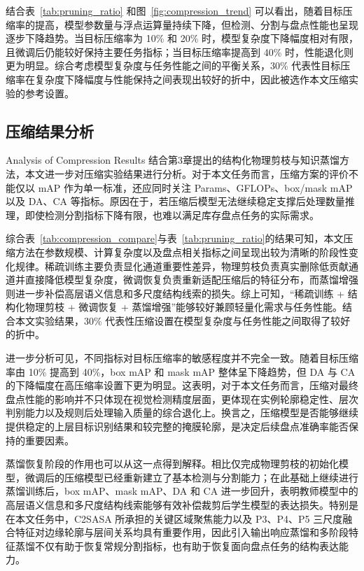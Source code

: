 结合表~\ref{tab:pruning_ratio} 和图~\ref{fig:compression_trend} 可以看出，随着目标压缩率的提高，模型参数量与浮点运算量持续下降，但检测、分割与盘点性能也呈现逐步下降趋势。当目标压缩率为 10\% 和 20\% 时，模型复杂度下降幅度相对有限，且微调后仍能较好保持主要任务指标；当目标压缩率提高到 40\% 时，性能退化则更为明显。综合考虑模型复杂度与任务性能之间的平衡关系，30\% 代表性目标压缩率在复杂度下降幅度与性能保持之间表现出较好的折中，因此被选作本文压缩实验的参考设置。

\subsection{压缩结果分析}{Analysis of Compression Results}
结合第3章提出的结构化物理剪枝与知识蒸馏方法，本文进一步对压缩实验结果进行分析。对于本文任务而言，压缩方案的评价不能仅以 mAP 作为单一标准，还应同时关注 Params、GFLOPs、box/mask mAP 以及 DA、CA 等指标。原因在于，若压缩后模型无法继续稳定支撑后处理数量推理，即使检测分割指标下降有限，也难以满足库存盘点任务的实际需求。

综合表~\ref{tab:compression_compare}与表~\ref{tab:pruning_ratio}的结果可知，本文压缩方法在参数规模、计算复杂度以及盘点相关指标之间呈现出较为清晰的阶段性变化规律。稀疏训练主要负责显化通道重要性差异，物理剪枝负责真实删除低贡献通道并直接降低模型复杂度，微调恢复负责重新适配压缩后的特征分布，而蒸馏增强则进一步补偿高层语义信息和多尺度结构线索的损失。综上可知，“稀疏训练 + 结构化物理剪枝 + 微调恢复 + 蒸馏增强”能够较好兼顾轻量化需求与任务性能。结合本文实验结果，30\% 代表性压缩设置在模型复杂度与任务性能之间取得了较好的折中。

进一步分析可见，不同指标对目标压缩率的敏感程度并不完全一致。随着目标压缩率由 10\% 提高到 40\%，box mAP 和 mask mAP 整体呈下降趋势，但 DA 与 CA 的下降幅度在高压缩率设置下更为明显。这表明，对于本文任务而言，压缩对最终盘点性能的影响并不只体现在视觉检测精度层面，更体现在实例轮廓稳定性、层次判别能力以及规则后处理输入质量的综合退化上。换言之，压缩模型是否能够继续提供稳定的上层目标识别结果和较完整的掩膜轮廓，是决定后续盘点准确率能否保持的重要因素。

蒸馏恢复阶段的作用也可以从这一点得到解释。相比仅完成物理剪枝的初始化模型，微调后的压缩模型已经重新建立了基本检测与分割能力；在此基础上继续进行蒸馏训练后，box mAP、mask mAP、DA 和 CA 进一步回升，表明教师模型中的高层语义信息和多尺度结构线索能够有效补偿裁剪后学生模型的表达损失。特别是在本文任务中，C2SASA 所承担的关键区域聚焦能力以及 P3、P4、P5 三尺度融合特征对边缘轮廓与层间关系均具有重要作用，因此引入输出响应蒸馏和多阶段特征蒸馏不仅有助于恢复常规分割指标，也有助于恢复面向盘点任务的结构表达能力。

